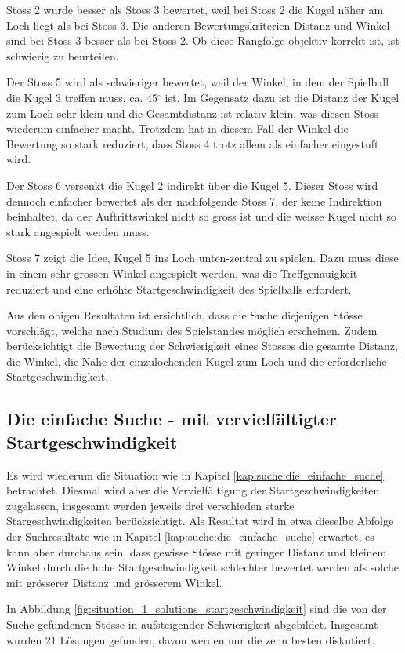 Stoss 2 wurde besser als Stoss 3 bewertet, weil bei Stoss 2 die Kugel näher am Loch liegt als bei Stoss 3. Die anderen
Bewertungskriterien Distanz und Winkel sind bei Stoss 3 besser als bei Stoss 2.
Ob diese Rangfolge objektiv korrekt ist, ist schwierig zu beurteilen.

Der Stoss 5 wird als schwieriger bewertet, weil der Winkel, in dem der Spielball die Kugel 3 treffen muss, ca. 45$^{\circ}$ ist.
Im Gegensatz dazu ist die Distanz der Kugel zum Loch sehr klein und die Gesamtdistanz ist relativ klein, was diesen Stoss
wiederum einfacher macht. Trotzdem hat in diesem Fall der Winkel die Bewertung so stark reduziert, dass Stoss 4 trotz allem
als einfacher eingestuft wird.

Der Stoss 6 versenkt die Kugel 2 indirekt über die Kugel 5. Dieser Stoss wird dennoch einfacher bewertet als der
nachfolgende Stoss 7, der keine Indirektion beinhaltet, da der Auftrittswinkel nicht so gross ist und die weisse Kugel
nicht so stark angespielt werden muss.

Stoss 7 zeigt die Idee, Kugel 5 ins Loch unten-zentral zu spielen.
Dazu muss diese in einem sehr grossen Winkel angespielt werden, was die Treffgenauigkeit reduziert und eine
erhöhte Startgeschwindigkeit des Spielballs erfordert.

Aus den obigen Resultaten ist ersichtlich, dass die Suche diejenigen Stösse vorschlägt, welche nach Studium des Spielstandes
möglich erscheinen. Zudem berücksichtigt die Bewertung der Schwierigkeit eines Stosses die gesamte Distanz, die Winkel, die Nähe
der einzulochenden Kugel zum Loch und die erforderliche Startgeschwindigkeit.
\newpage

\subsection{Die einfache Suche - mit vervielfältigter Startgeschwindigkeit}
Es wird wiederum die Situation wie in Kapitel \ref{kap:suche:die_einfache_suche} betrachtet. Diesmal wird aber die Vervielfältigung der Startgeschwindigkeiten
zugelassen, insgesamt werden jeweils drei verschieden starke Stargeschwindigkeiten berücksichtigt.
Als Resultat wird in etwa dieselbe Abfolge der Suchresultate wie in Kapitel \ref{kap:suche:die_einfache_suche} erwartet, es kann aber durchaus
sein, dass gewisse Stösse mit geringer Distanz und kleinem Winkel durch die hohe Startgeschwindigkeit schlechter bewertet werden
als solche mit grösserer Distanz und grösserem Winkel.

In Abbildung \ref{fig:situation_1_solutions_startgeschwindigkeit} sind die von der Suche gefundenen Stösse in aufsteigender Schwierigkeit abgebildet.
Insgesamt wurden 21 Lösungen gefunden, davon werden nur die zehn besten diskutiert.

